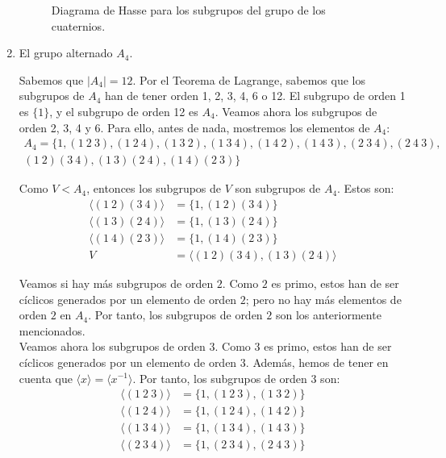 \begin{ejercicio}
\begin{enumerate}
\begin{figure}
            \caption{Diagrama de Hasse para los subgrupos del grupo de los cuaternios.}
            \label{fig:ej11_Q2}
        \end{figure}
        


        \item El grupo alternado $A_4$.
        
        Sabemos que $|A_4|=12$. Por el Teorema de Lagrange, sabemos que los subgrupos de $A_4$ han de tener orden 1, 2, 3, 4, 6 o 12. El subgrupo de orden 1 es $\{1\}$, y el subgrupo de orden 12 es $A_4$. Veamos ahora los subgrupos de orden 2, 3, 4 y 6. Para ello, antes de nada, mostremos los elementos de $A_4$:
        \begin{multline*}
            A_4=\{1,(1\ 2\ 3),(1\ 2\ 4),(1\ 3\ 2),(1\ 3\ 4),(1\ 4\ 2),(1\ 4\ 3),(2\ 3\ 4),(2\ 4\ 3),\\ (1\ 2)(3\ 4),(1\ 3)(2\ 4),(1\ 4)(2\ 3)\}
        \end{multline*}

        Como $V<A_4$, entonces los subgrupos de $V$ son subgrupos de $A_4$. Estos son:
        \begin{align*}
            \langle (1\ 2)(3\ 4)\rangle &= \{1,(1\ 2)(3\ 4)\}\\
            \langle (1\ 3)(2\ 4)\rangle &= \{1,(1\ 3)(2\ 4)\}\\
            \langle (1\ 4)(2\ 3)\rangle &= \{1,(1\ 4)(2\ 3)\}\\
            V&= \langle (1\ 2)(3\ 4),(1\ 3)(2\ 4)\rangle
        \end{align*}

        Veamos si hay más subgrupos de orden $2$. Como $2$ es primo, estos han de ser cíclicos generados por un elemento de orden $2$; pero no hay más elementos de orden $2$ en $A_4$. Por tanto, los subgrupos de orden $2$ son los anteriormente mencionados.\\

        Veamos ahora los subgrupos de orden $3$. Como $3$ es primo, estos han de ser cíclicos generados por un elemento de orden $3$. Además, hemos de tener en cuenta que $\langle x\rangle=\langle x^{-1}\rangle$. Por tanto, los subgrupos de orden $3$ son:
        \begin{align*}
            \langle (1\ 2\ 3)\rangle &= \{1,(1\ 2\ 3),(1\ 3\ 2)\}\\
            \langle (1\ 2\ 4)\rangle &= \{1,(1\ 2\ 4),(1\ 4\ 2)\}\\
            \langle (1\ 3\ 4)\rangle &= \{1,(1\ 3\ 4),(1\ 4\ 3)\}\\
            \langle (2\ 3\ 4)\rangle &= \{1,(2\ 3\ 4),(2\ 4\ 3)\}
        \end{align*}


\end{enumerate}
\end{ejercicio}
